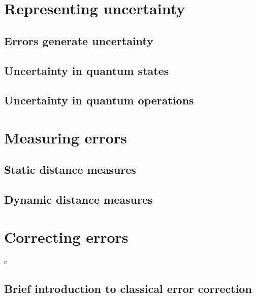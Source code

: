 \documentclass{article}
\begin{document}

\section{Representing uncertainty}


\subsection{Errors generate uncertainty}



\subsection{Uncertainty in quantum states}

\subsection{Uncertainty in quantum operations}

\section{Measuring errors}

\subsection{Static distance measures}

\subsection{Dynamic distance measures}

\section{Correcting errors}
c
\subsection{Brief introduction to classical error correction}
\end{document}
